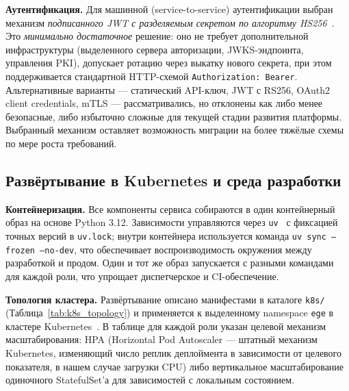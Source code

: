 \documentclass[a4paper,12pt]{extarticle}
\begin{document}
\textbf{Аутентификация.} Для машинной (service-to-service) аутентификации
выбран механизм \textit{подписанного JWT с разделяемым секретом по алгоритму
HS256}~\cite{rfc7519}. Это \textit{минимально достаточное} решение: оно не требует
дополнительной инфраструктуры (выделенного сервера авторизации, JWKS-эндпоинта,
управления PKI), допускает ротацию через выкатку нового секрета, при этом
поддерживается стандартной HTTP-схемой \texttt{Authorization: Bearer}.
Альтернативные варианты --- статический API-ключ, JWT с RS256, OAuth2 client
credentials, mTLS --- рассматривались, но отклонены как либо менее безопасные,
либо избыточно сложные для текущей стадии развития платформы. Выбранный механизм
оставляет возможность миграции на более тяжёлые схемы по мере роста
требований.

\subsection{Развёртывание в Kubernetes и среда разработки}
\label{subsec:deployment}

\textbf{Контейнеризация.} Все компоненты сервиса собираются в один контейнерный
образ на основе Python 3.12. Зависимости управляются через
\texttt{uv}~\cite{uv2024} с фиксацией точных версий в \texttt{uv.lock};
внутри контейнера используется команда \texttt{uv sync --frozen --no-dev},
что обеспечивает воспроизводимость окружения между разработкой и продом. Один
и тот же образ запускается с разными командами для каждой роли, что упрощает
диспетчерское и CI-обеспечение.

\textbf{Топология кластера.} Развёртывание описано манифестами в каталоге
\texttt{k8s/} (Таблица~\ref{tab:k8s_topology}) и применяется к выделенному
namespace \texttt{ege} в кластере Kubernetes~\cite{burns2016borg}. В таблице
для каждой роли указан целевой механизм масштабирования: HPA
(Horizontal Pod Autoscaler --- штатный механизм Kubernetes, изменяющий число
реплик деплоймента в зависимости от целевого показателя, в нашем случае
загрузки CPU) либо вертикальное масштабирование одиночного StatefulSet'а
для зависимостей с локальным состоянием.
\end{document}
